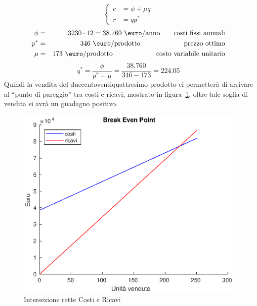 \setlength\arraycolsep{2pt}
\begin{displaymath}
\left\{ \begin{array}{rl}
c &= \phi + \mu q \\
r &= q p^* 
\end{array} \right .
\end{displaymath}
%
\begin{eqnarray*}
\phi &=& 3230 \cdot 12 = 38.760 \ \mbox{\euro/anno} \qquad \mbox{costi fissi
annuali} \\
p^* &=& 346 \ \mbox{\euro/prodotto} \ \qquad\quad\qquad\quad \mbox{prezzo ottimo} \\
\mu &=& 173 \ \mbox{\euro/prodotto} \ \qquad\quad\qquad\quad \mbox{costo variabile unitario}
\end{eqnarray*}
%
\begin{displaymath}
q^* = \frac{\phi}{p^* - \mu} = \frac{38.760}{346 - 173} = 224.05
\end{displaymath}
Quindi la vendita del duecentoventiquattresimo prodotto ci permetterà di
arrivare al “punto di pareggio” tra costi e ricavi, mostrato in
figura~\ref{bep}, oltre tale soglia di vendita si avrà un guadagno positivo.
%
\begin{figure}[!h]
\centering
\includegraphics[width=\textwidth]{figures/bep}
\caption{Intersezione rette Costi e Ricavi}
\label{bep}
\end{figure}
%
